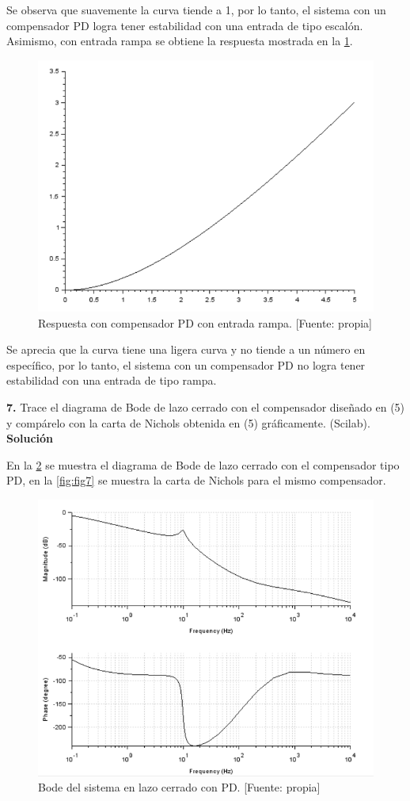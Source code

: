 \documentclass[12pt,letterpaper]{article}
\begin{document}
Se observa que suavemente la curva tiende a 1, por lo tanto, el sistema con un compensador PD logra tener estabilidad con una entrada de tipo escalón.\\

Asimismo, con entrada rampa se obtiene la respuesta mostrada en la \ref{fig:fig9}.\\

\begin{figure}[hbtp]
	\centering
	\includegraphics[width = .65 \columnwidth]{6rampa.png} 
	\caption[Figura7]{Respuesta con compensador PD con entrada rampa. [Fuente: propia]} 
	\label{fig:fig9} 
\end{figure}

Se aprecia que la curva tiene una ligera curva y no tiende a un número en específico, por lo tanto, el sistema con un compensador PD no logra tener estabilidad con una entrada de tipo rampa.

\bigskip

\bigskip

\textbf{7.} Trace el diagrama de Bode de lazo cerrado con el compensador diseñado en (5) y compárelo con la carta de Nichols obtenida en (5) gráficamente. (Scilab).\\

\textbf{Solución}

\bigskip

En la \ref{fig:bodePD} se muestra el diagrama de Bode de lazo cerrado con el compensador tipo PD, en la \ref{fig:fig7} se muestra la carta de Nichols para el mismo compensador.

\begin{figure}[hbtp]
	\centering
	\includegraphics[width = .65 \columnwidth]{BodePD.png} 
	\caption[Figura7]{Bode del sistema en lazo cerrado con PD. [Fuente: propia]} 
	\label{fig:bodePD} 
\end{figure}
\end{document}

